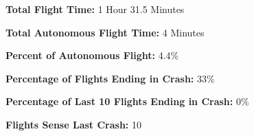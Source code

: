 \documentclass[]{auvsi_doc}
\begin{document}
\textbf{Total Flight Time:} 1 Hour 31.5 Minutes 

\textbf{Total Autonomous Flight Time:} 4 Minutes

\textbf{Percent of Autonomous Flight:} 4.4\%

\textbf{Percentage of Flights Ending in Crash:} 33\%

\textbf{Percentage of Last 10 Flights Ending in Crash:} 0\%

\textbf{Flights Sense Last Crash:} 10
\end{document}
